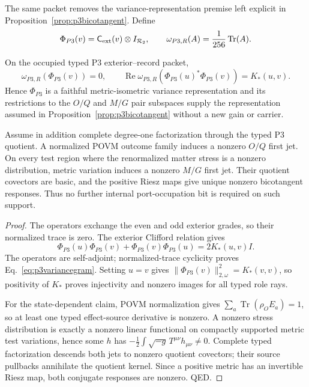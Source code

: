 The same packet removes the variance-representation premise left explicit in
Proposition~\ref{prop:p3bicotangent}.  Define
\begin{equation}
 \Phi_{P3}(v)=\mathsf C_{\rm ext}(v)\otimes I_{\mathcal R_2},
 \qquad
 \omega_{P3,R}(A)={1\over256}\operatorname{Tr}(A).
 \label{eq:p3variancerepresentation}
\end{equation}

\begin{proposition}
\label{prop:p3portoccupation}
On the occupied typed P3 exterior--record packet,
\begin{equation}
 \omega_{P3,R}(\Phi_{P3}(v))=0,
 \qquad
 \operatorname{Re}\omega_{P3,R}
 \left(\Phi_{P3}(u)^*\Phi_{P3}(v)\right)=K_*(u,v).
 \label{eq:p3variancegram}
\end{equation}
Hence $\Phi_{P3}$ is a faithful metric-isometric variance representation and
its restrictions to the $O/Q$ and $M/G$ pair subspaces supply the
representation assumed in Proposition~\ref{prop:p3bicotangent} without a new
gain or carrier.

Assume in addition complete degree-one factorization through the typed P3
quotient.  A normalized POVM outcome family induces a nonzero $O/Q$ first
jet.  On every test region where the renormalized matter stress is a nonzero
distribution, metric variation induces a nonzero $M/G$ first jet.  Their
quotient covectors are basic, and the positive Riesz maps give unique nonzero
bicotangent responses.  Thus no further internal port-occupation bit is
required on such support.
\end{proposition}

\begin{proof}
The operators exchange the even and odd exterior grades, so their normalized
trace is zero.  The exterior Clifford relation gives
\begin{equation}
 \Phi_{P3}(u)\Phi_{P3}(v)+\Phi_{P3}(v)\Phi_{P3}(u)
 =2K_*(u,v)I.
\end{equation}
The operators are self-adjoint; normalized-trace cyclicity proves
Eq.~\eqref{eq:p3variancegram}.  Setting $u=v$ gives
$\|\Phi_{P3}(v)\|_{2,\omega}^2=K_*(v,v)$, so positivity of $K_*$ proves
injectivity and nonzero images for all typed role rays.

For the state-dependent claim, POVM normalization gives
$\sum_a\operatorname{Tr}(\rho_OE_a)=1$, so at least one typed effect-source
derivative is nonzero.  A nonzero stress distribution is exactly a nonzero
linear functional on compactly supported metric test variations, hence some
$h$ has
$-\frac12\int\sqrt{-g}\,T^{\mu\nu}h_{\mu\nu}\ne0$.
Complete typed factorization descends both jets to nonzero quotient
covectors; their source pullbacks annihilate the quotient kernel.  Since a
positive metric has an invertible Riesz map, both conjugate responses are
nonzero. QED.
\end{proof}

